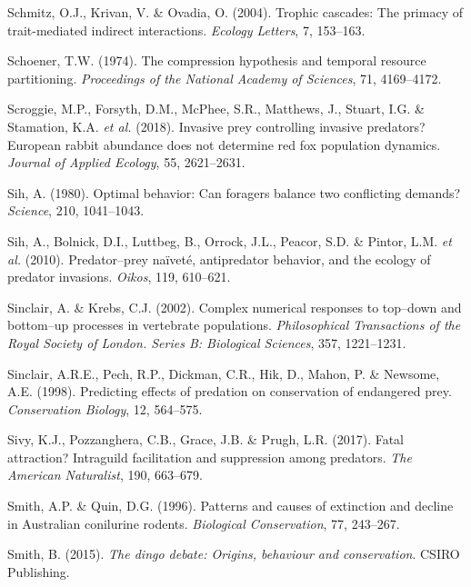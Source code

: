 \documentclass[11pt,a4paper,titlepage,twoside,openright]{style/unimelbthesis}
\begin{document}
\begin{mainmatter}
\leavevmode\hypertarget{ref-schmitz2004trophic}{}%
Schmitz, O.J., Krivan, V. \& Ovadia, O. (2004). Trophic cascades: The primacy of trait-mediated indirect interactions. \emph{Ecology Letters}, 7, 153--163.

\leavevmode\hypertarget{ref-schoener1974compression}{}%
Schoener, T.W. (1974). The compression hypothesis and temporal resource partitioning. \emph{Proceedings of the National Academy of Sciences}, 71, 4169--4172.

\leavevmode\hypertarget{ref-scroggie2018invasive}{}%
Scroggie, M.P., Forsyth, D.M., McPhee, S.R., Matthews, J., Stuart, I.G. \& Stamation, K.A. \emph{et al.} (2018). Invasive prey controlling invasive predators? European rabbit abundance does not determine red fox population dynamics. \emph{Journal of Applied Ecology}, 55, 2621--2631.

\leavevmode\hypertarget{ref-sih1980optimal}{}%
Sih, A. (1980). Optimal behavior: Can foragers balance two conflicting demands? \emph{Science}, 210, 1041--1043.

\leavevmode\hypertarget{ref-sih2010predator}{}%
Sih, A., Bolnick, D.I., Luttbeg, B., Orrock, J.L., Peacor, S.D. \& Pintor, L.M. \emph{et al.} (2010). Predator--prey naïveté, antipredator behavior, and the ecology of predator invasions. \emph{Oikos}, 119, 610--621.

\leavevmode\hypertarget{ref-sinclair2002complex}{}%
Sinclair, A. \& Krebs, C.J. (2002). Complex numerical responses to top--down and bottom--up processes in vertebrate populations. \emph{Philosophical Transactions of the Royal Society of London. Series B: Biological Sciences}, 357, 1221--1231.

\leavevmode\hypertarget{ref-sinclair1998predicting}{}%
Sinclair, A.R.E., Pech, R.P., Dickman, C.R., Hik, D., Mahon, P. \& Newsome, A.E. (1998). Predicting effects of predation on conservation of endangered prey. \emph{Conservation Biology}, 12, 564--575.

\leavevmode\hypertarget{ref-sivy2017fatal}{}%
Sivy, K.J., Pozzanghera, C.B., Grace, J.B. \& Prugh, L.R. (2017). Fatal attraction? Intraguild facilitation and suppression among predators. \emph{The American Naturalist}, 190, 663--679.

\leavevmode\hypertarget{ref-smith1996patterns}{}%
Smith, A.P. \& Quin, D.G. (1996). Patterns and causes of extinction and decline in Australian conilurine rodents. \emph{Biological Conservation}, 77, 243--267.

\leavevmode\hypertarget{ref-smith2015dingo}{}%
Smith, B. (2015). \emph{The dingo debate: Origins, behaviour and conservation}. CSIRO Publishing.


\end{mainmatter}
\end{document}
